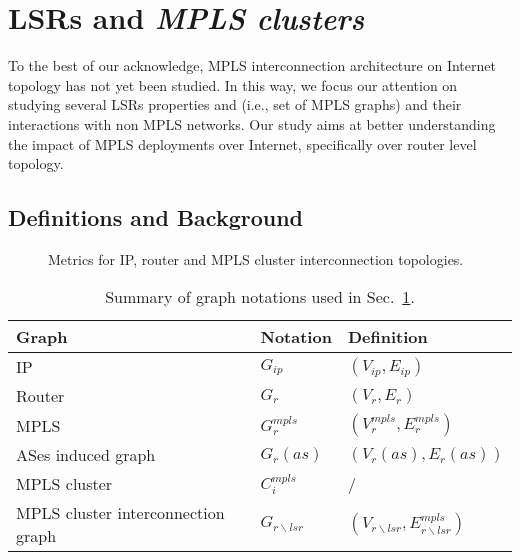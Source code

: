 \section{LSRs and \textit{MPLS clusters}}\label{cluster}
To the best of our acknowledge, MPLS interconnection architecture on Internet
topology has not yet been studied. In this way, we focus our attention on
studying several LSRs properties and  (i.e., set of MPLS
graphs) and their interactions with non MPLS networks. Our study aims at better
understanding the impact of MPLS deployments over Internet, specifically over
router level topology.

\subsection{Definitions and Background}\label{cluster.methodo}
\begin{figure*}[!htb]
  \begin{center}
    \hfil
    \hfil
  \end{center}
\caption{Metrics for IP, router and MPLS cluster interconnection
topologies.} 
\label{fig_metrics}
\end{figure*}

\begin{table}[!t]
  \begin{center}
    \begin{tabular}{l|ll}
    \textbf{Graph} & \textbf{Notation} & \textbf{Definition}\\
    \hline
    IP                 & $G_{ip}$ & $(V_{ip}, E_{ip})$\\
    Router             & $G_r$ & $(V_r, E_r)$\\    
    MPLS               & $G_r^{mpls}$ & $(V_r^{mpls}, E_r^{mpls})$\\
    ASes induced graph & $G_r(as)$ & $(V_r(as), E_r(as))$\\    
    MPLS cluster       & $C_i^{mpls}$ & /\\
    MPLS cluster interconnection graph & $G_{r \backslash lsr}$ & $(V_{r
    \backslash lsr}, E_{r \backslash lsr}^{mpls})$
    \end{tabular}
  \end{center}
  \caption{Summary of graph notations used in Sec.~\ref{cluster}.}
  \label{cluster.table_notations}
\end{table}

